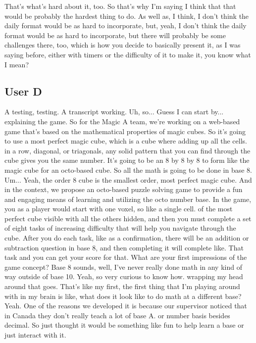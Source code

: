 \documentclass{article}
\begin{document}
That's what's hard about it, too. So that's why I'm saying I think that that would be probably the
hardest thing to do. As well as, I think, I don't think the daily format would be as hard to
incorporate, but, yeah, I don't think the daily format would be as hard to incorporate, but there will
probably be some challenges there, too, which is how you decide to basically present it, as I was
saying before, either with timers or the difficulty of it to make it, you know what I mean?

\subsection{User D}

A testing, testing.
A transcript working.
Uh, so...
Guess I can start by...
explaining the game. So for the Magic A team, we're working on a web-based game that's based on the mathematical properties of magic cubes. So it's going to use a most perfect magic cube, which is a cube where adding up all the cells.
in a row, diagonal, or triagonals, any solid pattern that you can find through the cube gives you the same number.
It's going to be an 8 by 8 by 8 to form like the magic cube for an octo-based cube. So all the math is going to be done in base 8.
Um...
Yeah, the order 8 cube is the smallest order, most perfect magic cube. And in the context, we propose an octo-based puzzle solving game to provide a fun and engaging means of learning and utilizing the octo number base. In the game, you as a player would start with one voxel, so like a single cell.
of the most perfect cube visible with all the others hidden, and then you must complete a set of eight tasks of increasing difficulty that will help you navigate through the cube. After you do each task, like as a confirmation, there will be an addition or subtraction question in base 8, and then completing it will complete like.
That task and you can get your score for that.
What are your first impressions of the game concept? Base 8 sounds, well, I've never really done math in any kind of way outside of base 10. Yeah, so very curious to know how.
wrapping my head around that goes.
That's like my first, the first thing that I'm playing around with in my brain is like, what does it look like to do math at a different base? Yeah. One of the reasons we developed it is because our supervisor noticed that in Canada they don't really teach a lot of base A.
or number basis besides decimal. So just thought it would be something like fun to help learn a base or just interact with it.
\end{document}
